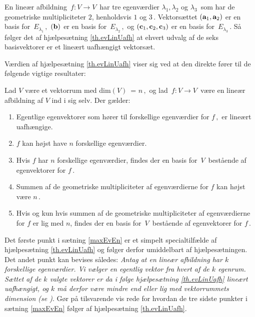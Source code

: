 \begin{example}
En lineær afbildning $\,f:V\rightarrow V\,$ har tre egenværdier $\lambda_1, \lambda_2$ og $\lambda_3\,$ som har de geometriske multipliciteter $2$, henholdsvis $1$ og $3\,.$ Vektorsættet $(\mathbf{a}_1,\mathbf{a}_2)$ er en basis for $\,E_{\lambda_1}\,,$ $(\mathbf{b})$ er en basis for $\,E_{\lambda_2}\,,$ og $(\mathbf{c}_1,\mathbf{c}_2,\mathbf{c}_3)$ er en basis for $\,E_{\lambda_3}\,.$ Så følger det af hjælpesætning \ref{th.evLinUafh} at ehvert udvalg af de seks basisvektorer er et lineært uafhængigt vektorsæt.
\end{example}

Værdien af hjælpesætning \ref{th.evLinUafh} viser sig ved at den direkte fører til de følgende vigtige resultater:

\begin{theorem}\label{maxEvEn}
Lad $V$ være et vektorrum med dim$(V)\,$ = $n\,,$ og lad  $\,f:V\rightarrow V\,$ være en lineær afbildning af $V$ ind i sig selv. Der gælder:
\begin{enumerate}
\item
Egentlige egenvektorer som hører til forskellige egenværdier for $f\,,$ er lineært uafhængige.
\item
$f$ kan højst have $n$ forskellige egenværdier. 
\item
Hvis $f$ har $n$ forskellige egenværdier, findes der en basis for $\,V\,$ bestående af egenvektorer for $f\,$. 
\item
Summen af de geometriske multipliciteter af egenværdierne for $f$ kan højst være $n\,$.
\item
Hvis og kun hvis summen af de geometriske multipliciteter af egenværdierne for $f$ er lig med $n$, findes der en basis for $\,V\,$ bestående af egenvektorer for $f\,$.
\end{enumerate}
\end{theorem}

\begin{exercise}\label{EVegenskaber}
Det første punkt i sætning \ref{maxEvEn} er et simpelt specialtilfælde af hjælpesætning \ref{th.evLinUafh} og følger derfor umiddelbart af hjælpesætningen. Det andet punkt kan bevises således:\bs
\textit{Antag at en lineær afbildning har $k$ forskellige egenværdier. Vi vælger en egentlig vektor fra hvert af de $k$ egenrum. Sættet af de $k$ valgte vektorer er da i følge hjælpesætning \ref{th.evLinUafh} lineært uafhængigt, og $k$ må derfor være mindre end eller lig med vektorrummets dimension (se )}.\bs
Gør på tilsvarende vis rede for hvordan de tre sidste punkter i sætning \ref{maxEvEn} følger af hjælpesætning \ref{th.evLinUafh}.
\end{exercise}

